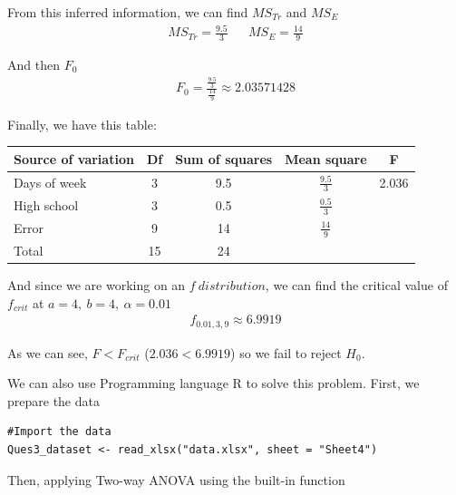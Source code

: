 \documentclass[a4paper]{article}
\numberwithin{equation}{section}
\begin{document}
From this inferred information, we can find \(MS_{Tr}\) and \(MS_{E}\)
\begin{align*}
  MS_{Tr} = \frac{9.5}{3} &  & MS_{E} = \frac{14}{9}
\end{align*}

And then \(F_0\)
\begin{align*}
  F_0 = \frac{\frac{9.5}{3}}{\frac{14}{9}} \approx 2.03571428
\end{align*}

Finally, we have this table:

\begin{center}
  \begin{tabular}{lcccc}
    \toprule
    Source of variation & Df & Sum of squares & Mean square       & F     \\
    \midrule
    Days of week        & 3  & 9.5            & \(\frac{9.5}{3}\) & 2.036 \\
    High school         & 3  & 0.5            & \(\frac{0.5}{3}\)         \\
    Error               & 9  & 14             & \(\frac{14}{9}\)          \\
    Total               & 15 & 24                                         \\
    \bottomrule
  \end{tabular}
\end{center}

And since we are working on an \(f\ distribution\), we can find the critical value of \(f_{crit}\) at \(a = 4,\ b = 4,\ \alpha = 0.01\)
\begin{align*}
  f_{0.01,3,9} \approx 6.9919
\end{align*}

As we can see, \(F < F_{crit}\) (\(2.036 < 6.9919\)) so we fail to reject \(H_0\).

\newpage
We can also use Programming language R to solve this problem.
First, we prepare the data
\begin{mdframed}[leftline=false,rightline=false,backgroundcolor=magenta!10,nobreak=true]
  \begin{verbatim}
#Import the data
Ques3_dataset <- read_xlsx("data.xlsx", sheet = "Sheet4")

  \end{verbatim}
\end{mdframed}

Then, applying Two-way ANOVA using the built-in function
\end{document}
